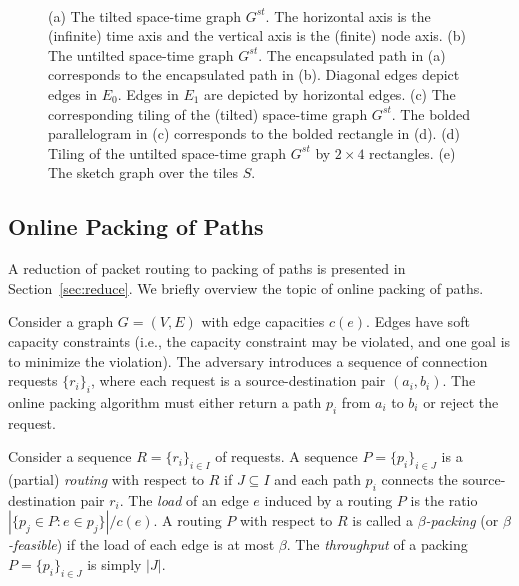 \documentclass[11pt]{article}
\newenvironment{proof sketch}[1]{\noindent {\emph{Proof sketch of #1:}}}{\hfill \qed}
\begin{document}
\begin{figure}\centering
   \qquad
  \\ \quad
{}\quad
\caption{\footnotesize(a) The tilted space-time graph $G^{st}$. The  horizontal axis is the (infinite) time axis and the vertical axis is the (finite) node axis.
(b) The untilted space-time graph $G^{st}$. The encapsulated path in (a) corresponds to the encapsulated path in (b).
Diagonal edges depict edges in $E_0$. Edges in $E_1$ are depicted by horizontal edges.
(c) The corresponding tiling of the (tilted) space-time graph $G^{st}$. The bolded parallelogram in (c) corresponds to the bolded rectangle in (d).
(d) Tiling of the untilted space-time graph $G^{st}$ by $2\times 4$ rectangles.
(e) The sketch graph over the tiles $S$.
}
\end{figure}

\subsection{Online Packing of Paths}
\label{sect:routing}

A reduction of packet routing to packing of paths is presented in Section~\ref{sec:reduce}. We briefly overview the topic of online packing of paths.

Consider a graph $G=(V,E)$ with edge capacities $c(e)$. Edges have soft capacity constraints (i.e., the capacity constraint may be violated, and one goal is to minimize the
violation).
The adversary introduces a sequence of connection requests
$\{r_i\}_i$, where each request is a source-destination pair
$(a_i,b_i)$. The online packing algorithm must either return a path
$p_i$ from $a_i$ to $b_i$ or reject the request.

Consider a sequence $R=\{r_i\}_{i\in I}$ of requests. A sequence
$P=\{p_i\}_{i \in J}$ is a (partial) \emph{routing} with respect to $R$ if
$J\subseteq I$ and each path $p_i$ connects the
source-destination pair $r_i$.  The \emph{load} of an edge $e$ induced
by a routing $P$ is the ratio $|\{p_j \in P: e\in p_j\}|/c(e)$.
A routing $P$ with respect to $R$ is called a \emph{$\beta$-packing} (or \emph{$\beta$-feasible}) if the
load of each edge is at most $\beta$. The \emph{throughput} of a packing
$P=\{p_i\}_{i\in J}$ is simply $|J|$.
\end{document}
